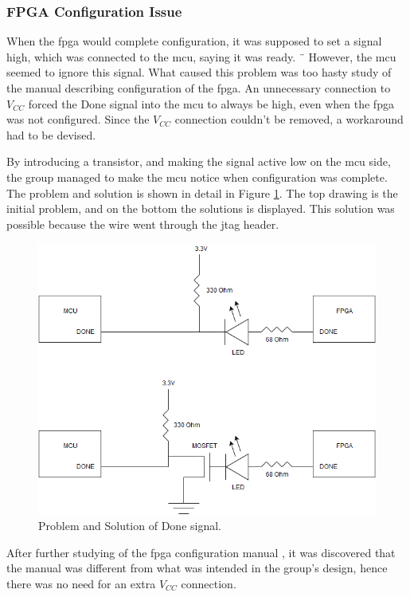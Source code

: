 \subsubsection{FPGA Configuration Issue}
When the \gls{fpga} would complete configuration, it was supposed to set a signal high, which was connected to the \gls{mcu}, saying it was ready. ¨
However, the \gls{mcu} seemed to ignore this signal.
What caused this problem was too hasty study of the manual describing configuration of the \gls{fpga}.
An unnecessary connection to \(V_{CC}\) forced the Done signal into the \gls{mcu} to always be high, even when the \gls{fpga} was not configured.
Since the \(V_{CC}\) connection couldn't be removed, a workaround had to be devised.

By introducing a transistor, and making the signal active low on the \gls{mcu} side, the group managed to make the \gls{mcu} notice when configuration was complete.
The problem and solution is shown in detail in Figure \ref{fig:Done Issue}. The top drawing is the initial problem, and on the bottom the solutions is displayed.
This solution was possible because the wire went through the \gls{jtag} header.

\begin{figure}[h!]
\centering
\includegraphics[scale=0.5]{images/Done_Signal_Issue.png}
\caption{Problem and Solution of Done signal.}
\label{fig:Done Issue}
\end{figure}

After further studying of the \gls{fpga} configuration manual \cite[page 42]{fpga-configuration},
it was discovered that the manual was different from what was intended in the group's design,
hence there was no need for an extra \(V_{CC}\) connection.

